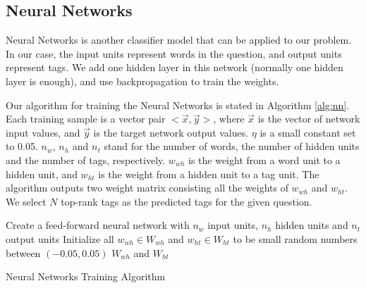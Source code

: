 
\subsection{Neural Networks}

Neural Networks is another classifier model that can be applied to our problem. In our case, the input units represent words in the question, and output units represent tags. We add one hidden layer in this network (normally one hidden layer is enough), and use backpropagation to train the weights. 

Our algorithm for training the Neural Networks is stated in Algorithm \ref{alg:nn}. Each training sample is a vector pair $<\overrightarrow{x},\overrightarrow{y}>$, where $\overrightarrow{x}$ is the vector of network input values, and $\overrightarrow{y}$ is the target network output values. $\eta$ is a small constant set to 0.05. $n_w$, $n_h$ and $n_t$ stand for the number of words, the number of hidden units and the number of tags, respectively. $w_{wh}$ is the weight from a word unit
to a hidden unit, and $w_{ht}$ is the weight from a hidden unit to a tag unit. The algorithm outputs two weight matrix consisting all the weights of $w_{wh}$ and $w_{ht}$. We select $N$ top-rank tags as the predicted tags for the given question.

\IncMargin{1em}
\begin{algorithm}
\label{alg:nn}
\BlankLine
Create a feed-forward neural network with $n_w$ input units, $n_h$ hidden units and $n_t$ output units\;
Initialize all $w_{wh} \in W_{wh}$ and $w_{ht} \in W_{ht}$ to be small random numbers between $(-0.05, 0.05)$\;
\Return $W_{wh}$ and $W_{ht}$ \;

\caption{Neural Networks Training Algorithm}\label{algo_disjdecomp}
\end{algorithm}\DecMargin{1em}
